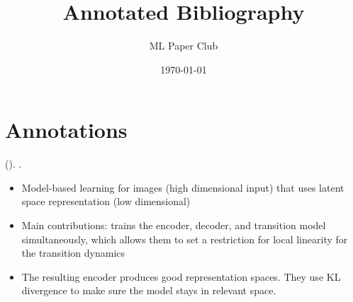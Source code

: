 \documentclass[12pt]{article}
\title{Annotated Bibliography}
\author{ML Paper Club}
\date{\today}
\begin{document}
\maketitle

\section*{Annotations}

\begin{hangparas}{1em}{1}
    \citeauthor{DBLP:journals/corr/WatterSBR15}
    (\citeyear{DBLP:journals/corr/WatterSBR15}).
    \textit{}.
    \printbibliography[heading=none, keyword=DBLP:journals/corr/WatterSBR15]

    \begin{itemize}
    \item Model-based learning for images (high dimensional input) that uses
    latent space representation (low dimensional)
    \item Main contributions: trains the encoder, decoder, and transition model
    simultaneously, which allows them to set a restriction for local linearity
    for the transition dynamics
    \item The resulting encoder produces good representation spaces. They use KL
    divergence to make sure the model stays in relevant space.
    \end{itemize}
    \end{hangparas}
\end{document}

